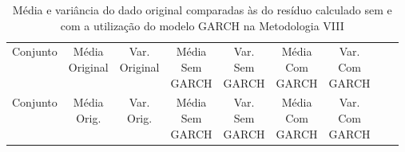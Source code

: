 \clearpage

\begin{center}
\begin{longtable}{ccccccccc}
\toprule
\rowcolor{white}
\caption[Metodologia VIII: dados estatísticos]{Média e variância do dado original
comparadas às do resíduo calculado sem e com a utilização do modelo GARCH na
Metodologia VIII} \label{tab:DadosEstatisticosMet8}\\
\midrule
    Conjunto & \specialcell{Média\\Original} &
    \specialcell{Var.\\Original} & \specialcell{Média\\Sem\\GARCH} &
    \specialcell{Var.\\Sem\\GARCH} & \specialcell{Média\\Com\\GARCH}&
    \specialcell{Var.\\Com\\GARCH} \\

\midrule
\endfirsthead 
\midrule
\rowcolor{white}
    Conjunto & \specialcell{Média\\Orig.} &
    \specialcell{Var.\\Orig.} & \specialcell{Média\\Sem\\GARCH} &
    \specialcell{Var.\\Sem\\GARCH} & \specialcell{Média\\Com\\GARCH}&
    \specialcell{Var.\\Com\\GARCH} \\


\end{longtable}
\end{center}
